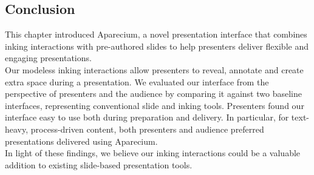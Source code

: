 \subsection{Conclusion}
This chapter introduced Aparecium, a novel presentation interface that combines inking interactions with pre-authored slides to help presenters deliver flexible and engaging presentations.\\

Our modeless inking interactions allow presenters to reveal, annotate and create extra space during a presentation. We evaluated our interface from the perspective of presenters and the audience by comparing it against two baseline interfaces, representing conventional slide and inking tools. Presenters found our interface easy to use both during preparation and delivery. In particular, for text-heavy, process-driven content, both presenters and audience preferred presentations delivered using Aparecium.\\ 

In light of these findings, we believe our inking interactions could be a valuable addition to existing slide-based presentation tools.


